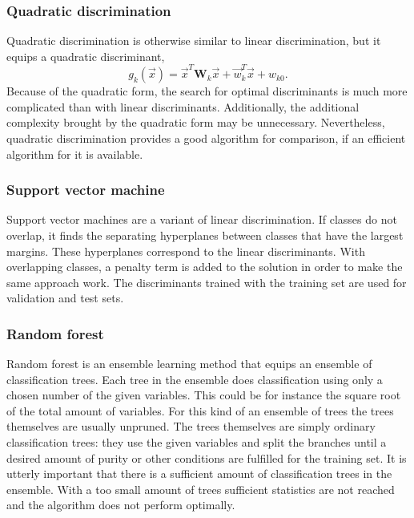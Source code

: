 \documentclass[twoside]{article}
\renewcommand{\v}[1]{\vec{#1}}
\begin{document}
\begin{multicols}{2}
\subsubsection{Quadratic discrimination}

Quadratic discrimination is otherwise similar to linear discrimination, but it equips a quadratic discriminant,
\begin{equation}
 g_k(\v{x}) = \v{x}^T \mathbf{W}_k \v{x} + \v{w}_k^T \v{x} + w_{k0}.
\end{equation}
Because of the quadratic form, the search for optimal discriminants is much more complicated than with linear
discriminants. Additionally, the additional complexity brought by the quadratic form may be unnecessary.
Nevertheless, quadratic discrimination provides a good algorithm for comparison, if an efficient algorithm
for it is available.

\subsubsection{Support vector machine}

Support vector machines are a variant of linear discrimination. If classes do not overlap, it finds
the separating hyperplanes between classes that have the largest margins. These hyperplanes correspond 
to the linear discriminants. With overlapping classes, a penalty term is added to the solution in order
to make the same approach work. The discriminants trained with the training set are used for validation
and test sets.

\subsubsection{Random forest}

Random forest \cite{Forest} is an ensemble learning method that equips an ensemble of classification trees. Each tree 
in the ensemble does classification using only a chosen number of the given variables. This could be for
instance the square root of the total amount of variables. For this kind of an ensemble of trees
the trees themselves are usually unpruned. The trees themselves are simply ordinary classification trees:
they use the given variables and split the branches until a desired amount of purity or other conditions
are fulfilled for the training set. It is utterly important that there is a sufficient amount of classification
trees in the ensemble. With a too small amount of trees sufficient statistics are not reached and the algorithm
does not perform optimally.


\end{multicols}
\end{document}
